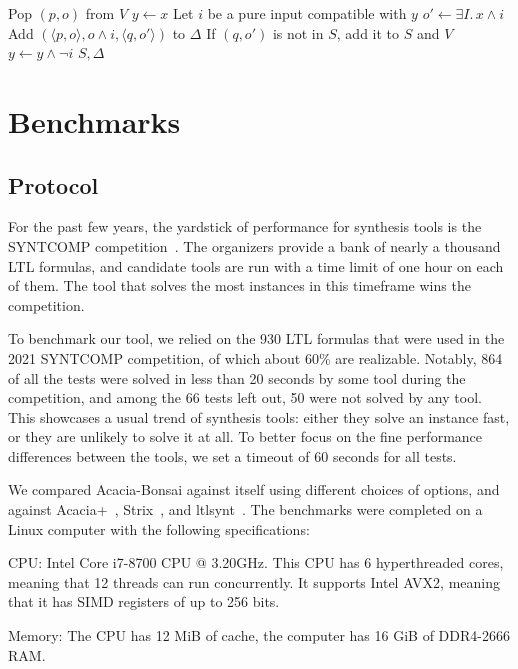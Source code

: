 \documentclass[runningheads,a4paper]{llncs}
\begin{document}
\begin{algorithm}
  \begin{algorithmic}
  \State Pop $(p,o)$ from $V$
    \State $y \leftarrow x$
     
      \State Let \(i\) be a pure input compatible with \(y\)
      \State \(o' \leftarrow \exists I.\, x \land i\) 
      \State Add $(\langle p, o\rangle, o \land i, \langle q, o'\rangle)$ to $\Delta$
      \State If $(q,o')$ is not in $S$, add it to $S$ and $V$
      \State $y \leftarrow y \land \lnot i$
    \EndWhile
  \EndFor
\EndWhile
\State \Return \(S,\Delta\)
\end{algorithmic}
\end{algorithm}

\section{Benchmarks}\label{sec:benchmarks}

\subsection{Protocol}

For the past few years, the yardstick of performance for synthesis tools is the
SYNTCOMP competition~\cite{syntcomp21}.  The organizers provide a bank of nearly a
thousand LTL formulas, and candidate tools are run with a time limit of one hour
on each of them.  The tool that solves the most instances in this timeframe wins
the competition.

To benchmark our tool, we relied on the 930 LTL formulas that were used in the
2021 SYNTCOMP competition, of which about 60\% are realizable.  Notably, 864 of
all the tests were solved in less than 20 seconds by some tool during the
competition, and among the 66 tests left out, 50 were not solved by any tool.
This showcases a usual trend of synthesis tools: either they solve an instance
fast, or they are unlikely to solve it at all.  To better focus on the fine
performance differences between the tools, we set a timeout of 60 seconds for
all tests.

We compared Acacia-Bonsai against itself using different choices of options, and
against Acacia+~\cite{bbfjr12}, Strix~\cite{msl18}, and
ltlsynt~\cite{duret.16.atva2,mc18}.  The benchmarks were completed on a
Linux computer with the following specifications:
\begin{compactitem}
\item CPU: Intel\textregistered{} Core\texttrademark{} i7-8700 CPU @ 3.20GHz.  This CPU
  has 6 hyperthreaded cores, meaning that 12 threads can run concurrently.  It
  supports Intel\textregistered{} AVX2, meaning that it has SIMD registers of up to
  256 bits.
\item Memory: The CPU has 12 MiB of cache, the computer has 16 GiB of DDR4-2666
  RAM.
\end{compactitem}
\end{document}
